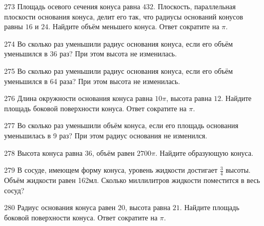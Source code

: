 \documentclass[a4paper]{article}
\begin{document}
\begin{taskBN}{273}
Площадь осевого сечения конуса равна $432$. Плоскость, параллельная плоскости основания конуса,  делит его так, что радиусы оснований конусов равны $16$ и $24$. Найдите объём меньшего конуса. Ответ сократите на $\pi$.
\end{taskBN}

\begin{taskBN}{274}
Во сколько раз уменьшили радиус основания конуса, если его объём уменьшился в 36 раз? При этом высота не изменилась.
\end{taskBN}

\begin{taskBN}{275}
Во сколько раз уменьшили радиус основания конуса, если его объём уменьшился в 64 раза? При этом высота не изменилась.
\end{taskBN}

\begin{taskBN}{276}
Длина окружности основания конуса равна $10\pi$, высота равна $12$. Найдите площадь боковой поверхности конуса. Ответ сократите на $\pi$.
\end{taskBN}

\begin{taskBN}{277}
Во сколько раз уменьшили объём конуса, если его площадь основания уменьшилась в 9 раз? При этом радиус основания не изменился.
\end{taskBN}

\begin{taskBN}{278}
Высота конуса равна $36$, объём равен $2700\pi$. Найдите образующую конуса. 
\end{taskBN}

\begin{taskBN}{279}
В сосуде, имеющем форму конуса, уровень жидкости достигает $\frac{3}{4}$ высоты. Объём жидкости равен 162мл. Сколько миллилитров жидкости поместится в весь сосуд?
\end{taskBN}

\begin{taskBN}{280}
Радиус основания конуса равен $20$, высота равна $21$. Найдите площадь боковой поверхности конуса. Ответ сократите на $\pi$.
\end{taskBN}
\end{document}
